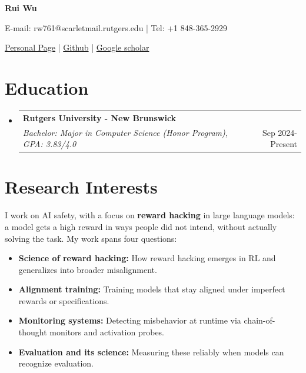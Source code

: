 \documentclass[a4paper,11pt]{article}
\makeatletter
\newcommand{\resumeSubheading}[4]{
\vspace{0.5mm}\item
    \begin{tabular*}{0.98\textwidth}[t]{l@{\extracolsep{\fill}}r}
        \textbf{#1} & \textit{\footnotesize{#4}} \\
        \textit{\footnotesize{#3}} &  \footnotesize{#2}\\
    \end{tabular*}
    \vspace{-2.4mm}
}
\newcommand{\resumeSubHeadingListStart}{\begin{itemize}[leftmargin=*,labelsep=1mm]}
\newcommand{\resumeSubHeadingListEnd}{\end{itemize}\vspace{2mm}}
\newcommand{\socialicon}[1]{\raisebox{-0.05em}{\resizebox{!}{1em}{#1}}}
\newcommand{\headerfontiii}{\fontfamily{ppl}\selectfont} %
\makeatother
\begin{document}
\headerfontiii

\begin{center}
    {\Huge\textbf{Rui Wu}}
\end{center}
\vspace{-4mm}

\begin{center}

    \small{
    E-mail: rw761@scarletmail.rutgers.edu | Tel: +1 848-365-2929 
    }
\end{center}
\begin{center}
\vspace{0.7mm}
    \small{
    \socialicon{\faHome} \href{https://ruiwu1123.github.io/}{Personal Page} |  
        \socialicon{\faGithub} \href{https://github.com/RuiWu1123}{Github} | 
    \socialicon{\faGoogle}
    \href{https://scholar.google.com/citations?user=M1FovLwAAAAJ&hl=zh-CN}{Google scholar} 
    }
\end{center}

\vspace{-7mm}



    






\section{\textbf{Education}}
\vspace{0.6mm}
\resumeSubHeadingListStart
\resumeSubheading
{Rutgers University - New Brunswick}{Sep 2024-Present}
{Bachelor: Major in Computer Science (Honor Program), GPA: 3.83/4.0}{}

\resumeSubHeadingListEnd
\vspace{-5.5mm}


\section{\textbf{Research Interests}}
\vspace{1mm}
\small{
I work on AI safety, with a focus on \textbf{reward hacking} in large language models: a model gets a high reward in ways people did not intend, without actually solving the task. My work spans four questions:
\begin{itemize}
\item \textbf{Science of reward hacking:} How reward hacking emerges in RL and generalizes into broader misalignment.
\item \textbf{Alignment training:} Training models that stay aligned under imperfect rewards or specifications.
\item \textbf{Monitoring systems:} Detecting misbehavior at runtime via chain-of-thought monitors and activation probes.
\item \textbf{Evaluation and its science:} Measuring these reliably when models can recognize evaluation.
\end{itemize}
}
\vspace{-4mm}
\end{document}
